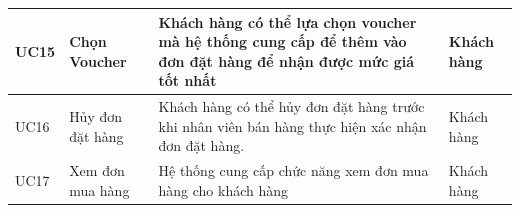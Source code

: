\documentclass[12pt,a4paper,2sides]{report}
\begin{document}
\begin{tabular}{|p{1cm}|p{3cm}|p{6cm}|p{3cm}|}
\hline
UC15 & Chọn Voucher                           & Khách hàng có thể lựa chọn voucher mà hệ thống cung cấp để thêm vào đơn đặt hàng để nhận được mức giá tốt nhất                                                                                                                           & Khách hàng                                                              \\ 
\hline
UC16 & Hủy đơn đặt hàng                       & Khách hàng có thể hủy đơn đặt hàng trước khi nhân viên bán hàng thực hiện xác nhận đơn đặt hàng.                                                                                                                                         & Khách hàng                                                              \\ 
\hline
UC17 & Xem đơn mua hàng                       & Hệ thống cung cấp chức năng xem đơn mua hàng cho khách hàng                                                                                                                                                                              & Khách hàng                                                              \\ 

\hline

\end{tabular}\\
\end{document}
